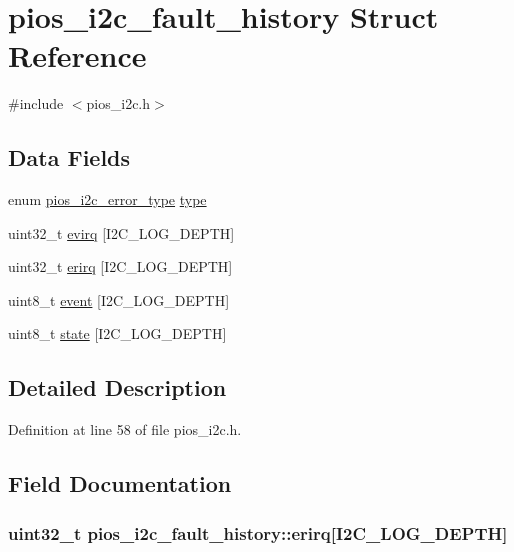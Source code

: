 \hypertarget{structpios__i2c__fault__history}{\section{pios\-\_\-i2c\-\_\-fault\-\_\-history \-Struct \-Reference}
\label{structpios__i2c__fault__history}
}


{\ttfamily \#include $<$pios\-\_\-i2c.\-h$>$}

\subsection*{\-Data \-Fields}
\begin{DoxyCompactItemize}
\item 
enum \hyperlink{group___p_i_o_s___i2_c_gace4c564ee87e97a12bf76c69b113b230}{pios\-\_\-i2c\-\_\-error\-\_\-type} \hyperlink{structpios__i2c__fault__history_af6d40156bcea64ae98966b65f779dccb}{type}
\item 
uint32\-\_\-t \hyperlink{structpios__i2c__fault__history_a77d686b8830f4fa32f9a2930df82be4d}{evirq} \mbox{[}\-I2\-C\-\_\-\-L\-O\-G\-\_\-\-D\-E\-P\-T\-H\mbox{]}
\item 
uint32\-\_\-t \hyperlink{structpios__i2c__fault__history_a7ffc99c5d0823e35355480c857e7dc6a}{erirq} \mbox{[}\-I2\-C\-\_\-\-L\-O\-G\-\_\-\-D\-E\-P\-T\-H\mbox{]}
\item 
uint8\-\_\-t \hyperlink{structpios__i2c__fault__history_a1c5b34cc902d5ba1916914dc3cf7d5ba}{event} \mbox{[}\-I2\-C\-\_\-\-L\-O\-G\-\_\-\-D\-E\-P\-T\-H\mbox{]}
\item 
uint8\-\_\-t \hyperlink{structpios__i2c__fault__history_aac4337b23aad02daaa33f5be193ea859}{state} \mbox{[}\-I2\-C\-\_\-\-L\-O\-G\-\_\-\-D\-E\-P\-T\-H\mbox{]}
\end{DoxyCompactItemize}


\subsection{\-Detailed \-Description}


\-Definition at line 58 of file pios\-\_\-i2c.\-h.



\subsection{\-Field \-Documentation}
\hypertarget{structpios__i2c__fault__history_a7ffc99c5d0823e35355480c857e7dc6a}{
\subsubsection[{erirq}]{\setlength{\rightskip}{0pt plus 5cm}uint32\-\_\-t {\bf pios\-\_\-i2c\-\_\-fault\-\_\-history\-::erirq}\mbox{[}\-I2\-C\-\_\-\-L\-O\-G\-\_\-\-D\-E\-P\-T\-H\mbox{]}}}\label{structpios__i2c__fault__history_a7ffc99c5d0823e35355480c857e7dc6a}


